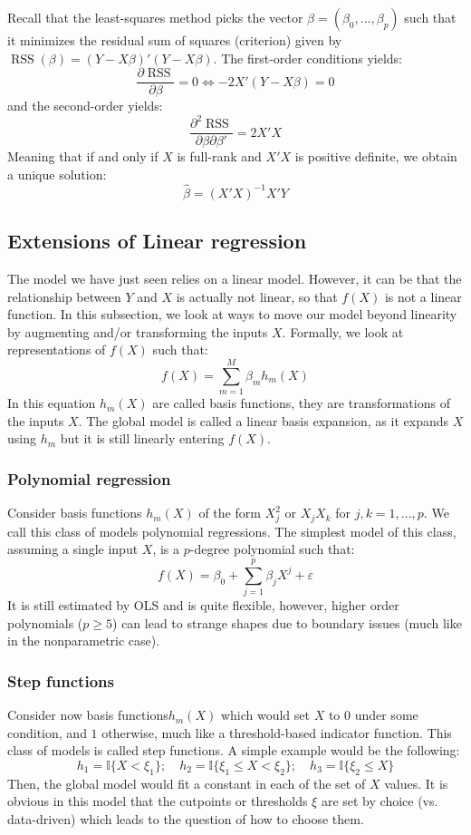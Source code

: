 \documentclass[12pt]{report}
\begin{document}
Recall that the least-squares method picks the vector $\beta = (\beta_0, ..., \beta_p)$ such that it minimizes the residual sum of squares (criterion) given by $\operatorname{RSS}(\beta) = (Y - X\beta)'(Y - X\beta)$. The first-order conditions yields: $$\frac{\partial \operatorname{RSS}}{\partial \beta} = 0 \Leftrightarrow -2X'(Y-X\beta) = 0 $$ and the second-order yields: $$\frac{\partial^2 \operatorname{RSS}}{\partial \beta\partial\beta'} = 2X'X $$
Meaning that if and only if $X$ is full-rank and $X'X$ is positive definite, we obtain a unique solution: $$\hat\beta = (X'X)^{-1}X'Y$$


\subsection{Extensions of Linear regression}

The model we have just seen relies on a linear model. However, it can be that the relationship between $Y$ and $X$ is actually not linear, so that $f(X)$ is not a linear function. In this subsection, we look at ways to move our model beyond linearity by augmenting and/or transforming the inputs $X$. Formally, we look at representations of $f(X)$ such that: $$f(X) = \sum_{m=1}^{M} \beta_m h_m(X) $$ In this equation $h_m(X)$ are called basis functions, they are transformations of the inputs $X$. The global model is called a linear basis expansion, as it expands $X$ using $h_m$ but it is still linearly entering $f(X)$.

\subsubsection{Polynomial regression}

Consider basis functions $h_m(X)$ of the form $X_j^2$ or $X_jX_k$ for $j,k = 1,...,p$. We call this class of models polynomial regressions. The simplest model of this class, assuming a single input $X$, is a $p$-degree polynomial such that: $$f(X) = \beta_0 + \sum_{j=1}^p \beta_jX^j + \varepsilon $$ It is still estimated by OLS and is quite flexible, however, higher order polynomials ($p\geq 5$) can lead to strange shapes due to boundary issues (much like in the nonparametric case).


\subsubsection{Step functions}

Consider now basis functions$h_m(X)$ which would set $X$ to 0 under some condition, and $1$ otherwise, much like a threshold-based indicator function. This class of models is called step functions. A simple example would be the following: $$ h_1 = \mathbb{I}\{X < \xi_1\};  \quad h_2 = \mathbb{I}\{\xi_1 \leq X < \xi_2\};  \quad h_3 = \mathbb{I}\{\xi_2 \leq X\}$$
Then, the global model would fit a constant in each of the set of $X$ values. It is obvious in this model that the cutpoints or thresholds $\xi$ are set by choice (vs. data-driven) which leads to the question of how to choose them.
\end{document}
